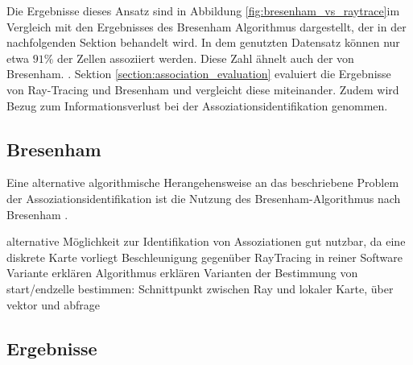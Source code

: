 Die Ergebnisse dieses Ansatz sind in Abbildung \ref{fig:bresenham_vs_raytrace}im Vergleich mit den Ergebnisses des Bresenham Algorithmus dargestellt, der in der nachfolgenden Sektion behandelt wird. In dem genutzten Datensatz können nur etwa $91\%$ der Zellen assoziiert werden. Diese Zahl ähnelt auch der von Bresenham. . Sektion \ref{section:association_evaluation} evaluiert die Ergebnisse von Ray-Tracing und Bresenham und vergleicht diese miteinander. Zudem wird Bezug zum Informationsverlust bei der Assoziationsidentifikation genommen.




\subsection{Bresenham}

Eine alternative algorithmische Herangehensweise an das beschriebene Problem der Assoziationsidentifikation ist die Nutzung des Bresenham-Algorithmus nach Bresenham \cite{bresenham1965algorithm}.



alternative Möglichkeit zur Identifikation von Assoziationen
gut nutzbar, da eine diskrete Karte vorliegt
Beschleunigung gegenüber RayTracing in reiner Software Variante erklären
Algorithmus erklären
Varianten der Bestimmung von start/endzelle bestimmen: Schnittpunkt zwischen Ray und lokaler Karte, über vektor und abfrage

\subsection{Ergebnisse}
\label{section:association_results}

